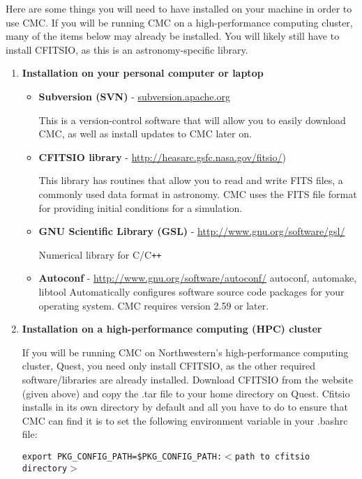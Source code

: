 \documentclass[11pt]{article}
\begin{document}
Here are some things you will need to have installed on your machine in order to use CMC. If you will be running CMC on a high-performance computing cluster, many of the items below may already be installed. You will likely still have to install CFITSIO, as this is an astronomy-specific library.
\begin{enumerate} 

\item \textbf{Installation on your personal computer or laptop}

\begin{itemize}

\item \textbf{Subversion (SVN)} - \url{subversion.apache.org}

This is a version-control software that will allow you to easily download CMC, as well as install updates to CMC later on.

\item \textbf{CFITSIO library} - \url{http://heasarc.gsfc.nasa.gov/fitsio/})

This library has routines that allow you to read and write  FITS files, a commonly used data format in astronomy. CMC uses the FITS file format for providing initial conditions for a simulation.

\item \textbf{GNU Scientific Library (GSL)} - \url{http://www.gnu.org/software/gsl/}


Numerical library for C/C\verb!++! 
\item \textbf{Autoconf} - \url{http://www.gnu.org/software/autoconf/}
autoconf, automake, libtool
Automatically configures software source code packages for your operating system. CMC requires version 2.59 or later. 

\end{itemize}

\item \textbf{Installation on a high-performance computing (HPC) cluster}

If you will be running CMC on Northwestern's high-performance computing cluster, Quest, you need only install CFITSIO, as the other required software/libraries are already installed. Download CFITSIO from the website (given above) and copy the .tar file to your home directory on Quest. Cfitsio installs in its own directory by default and all you have to do to ensure that CMC can find it is to set the following environment variable in your .bashrc file:

{\addtolength{\leftskip}{10mm} 
\texttt {export PKG\_CONFIG\_PATH=\$PKG\_CONFIG\_PATH:$<$path to cfitsio directory$>$}

}

\end{enumerate}
\end{document}
